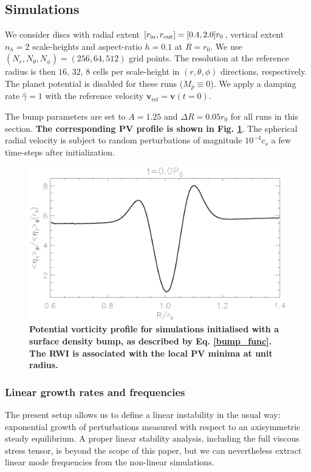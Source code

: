 \subsection{Simulations}
We consider discs with radial extent $[r_\mathrm{in},r_\mathrm{out}]=[0.4,2.0]r_0$,
vertical extent $n_h=2$ scale-heights and aspect-ratio $h=0.1$ at
$R=r_0$. We use $(N_r, N_\theta,
N_\phi)=(256,64,512)$ grid points. 
The resolution at the reference radius is then
$16,\,32,\,8$ cells per scale-height in $(r,\theta,\phi)$ directions,
respectively. The planet potential is disabled for these runs
($M_p\equiv 0$). We apply a damping rate $\hat{\gamma}=1$ with the
reference velocity $\bm{v}_\mathrm{ref}=\bm{v}(t=0)$.     

The bump parameters are set to $A=1.25$ and $\Delta R = 0.05r_0$ for
all runs in this section. {\bf The corresponding PV profile is shown
  in Fig. \ref{bump_PV}}. The spherical radial velocity is subject 
to random perturbations of magnitude $10^{-4}c_s$ 
a few time-steps after initialization. 


\begin{figure}
  \centering
  \includegraphics[width=\linewidth]{figures/bump0_vorten1d_000}
  \caption{{\bf Potential vorticity profile for simulations initialised
    with a surface density bump, as described by
    Eq. \ref{bump_func}. The RWI is associated with the local PV
    minima at unit radius.}
    \label{bump_PV}}
\end{figure}


\subsubsection{Linear growth rates and frequencies}
The present setup allows us to define a linear instability in the
usual way: exponential growth of perturbations measured with respect
to an axisymmetric steady equilibrium. A proper linear
stability analysis, including the full viscous stress tensor, is
beyond the scope of this paper, but we can nevertheless extract linear 
mode frequencies from the non-linear simulations.  

